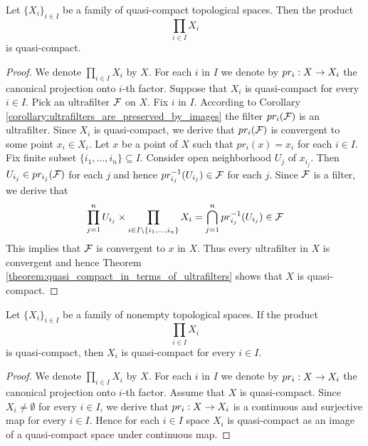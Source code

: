 \begin{theorem}\label{theorem:Tychonoff_theorem}
	Let $\big\{X_i\big\}_{i\in I}$ be a family of quasi-compact topological spaces. Then the product
	$$\prod_{i\in I}X_i$$
	is quasi-compact.
\end{theorem}
\begin{proof}
	We denote $\prod_{i\in I}X_i$ by $X$. For each $i$ in $I$ we denote by $pr_i:X \rightarrow X_i$ the canonical projection onto $i$-th factor. Suppose that $X_i$ is quasi-compact for every $i\in I$. Pick an ultrafilter ${\mathcal F}$ on $X$. Fix $i$ in $I$. According to Corollary \ref{corollary:ultrafilters_are_preserved_by_images} the filter $pr_i({\mathcal F})$ is an ultrafilter. Since $X_i$ is quasi-compact, we derive that $pr_i({\mathcal F})$ is convergent to some point $x_i \in X_i$. Let $x$ be a point of $X$ such that $pr_i(x) = x_i$ for each $i\in I$. Fix finite subset $\{i_1,...,i_n\}\subseteq I$. Consider open neighborhood $U_j$ of $x_{i_j}$. Then $U_{i_j}\in pr_{i_j}({\mathcal F})$ for each $j$ and hence $pr_{i_j}^{-1}(U_{i_j}) \in {\mathcal F}$ for each $j$. Since ${\mathcal F}$ is a filter, we derive that
	$$\prod_{j=1}^nU_{i_j}\times \prod_{i\in I \setminus \{i_1,...,i_n\}}X_i = \bigcap_{j=1}^n pr^{-1}_{i_j}(U_{i_j}) \in {\mathcal F}$$
	This implies that ${\mathcal F}$ is convergent to $x$ in $X$. Thus every ultrafilter in $X$ is convergent and hence Theorem \ref{theorem:quasi_compact_in_terms_of_ultrafilters} shows that $X$ is quasi-compact.
\end{proof}

\begin{theorem}\label{theorem:Tychonoff_theorem_converse}
	Let $\big\{X_i\big\}_{i\in I}$ be a family of nonempty topological spaces. If the product
	$$\prod_{i\in I}X_i$$
	is quasi-compact, then $X_i$ is quasi-compact for every $i\in I$.
\end{theorem}
\begin{proof}
	We denote $\prod_{i\in I}X_i$ by $X$. For each $i$ in $I$ we denote by $pr_i:X \rightarrow X_i$ the canonical projection onto $i$-th factor. Assume that $X$ is quasi-compact. Since $X_i \neq \emptyset$ for every $i\in I$, we derive that $pr_i:X\rightarrow X_i$ is a continuous and surjective map for every $i\in I$. Hence for each $i\in I$ space $X_i$ is quasi-compact as an image of a quasi-compact space under continuous map.
\end{proof}











\small




